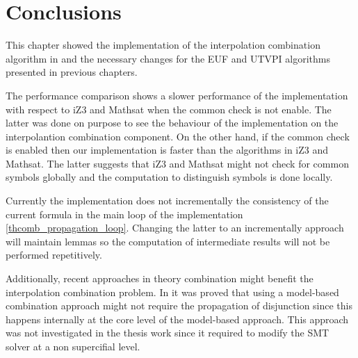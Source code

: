 \section{Conclusions}

This chapter showed the implementation of the
interpolation combination algorithm in 
\cite{10.1007/11532231_26} and the necessary
changes for the EUF and UTVPI algorithms
presented in previous chapters.

The performance comparison shows a slower performance
of the implementation with respect to iZ3 and Mathsat
when the common check is not enable. The latter was 
done on purpose to see the behaviour of the implementation
on the interpolantion combination component.
On the other hand, if the common check is enabled then
our implementation is faster than the algorithms in iZ3 and
Mathsat. The latter suggests that iZ3 and Mathsat might
not check for common symbols globally and the computation 
to distinguish symbols is done locally. 

Currently the implementation does not incrementally the 
consistency of the current formula in the main loop of 
the implementation \ref{thcomb_propagation_loop}. 
Changing the latter to an incrementally approach will
maintain lemmas so the computation of intermediate results
will not be performed repetitively. 

Additionally, recent approaches in theory combination
might benefit the interpolation combination problem. 
In \cite{10.1007/978-3-642-22119-4_1} it was proved that
using a model-based combination approach might not require
the propagation of disjunction since this happens internally
at the core level of the model-based approach. This approach
was not investigated in the thesis work since it required
to modify the SMT solver at a non supercifial level.


